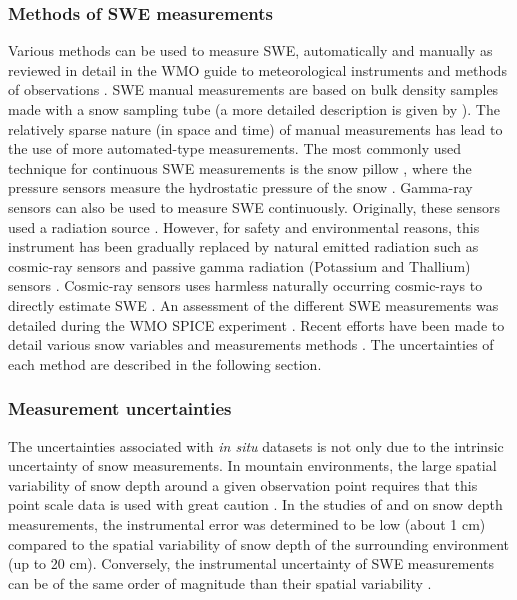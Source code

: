 \documentclass[utf8]{frontiersSCNS} %
\begin{document}
\subsubsection{Methods of SWE measurements}
Various methods can be used to measure SWE, automatically and manually as reviewed in detail in the WMO guide to meteorological instruments and methods of observations \citep{wmo2018}. SWE manual measurements are based on bulk density samples made with a snow sampling tube (a more detailed description is given by \citet{Leppanen_2016}). The relatively sparse nature (in space and time) of manual measurements has lead to the use of more automated-type measurements. The most commonly used technique for continuous SWE measurements is the snow pillow \citep{Serreze_1999,Smith_2017}, where the pressure sensors measure the hydrostatic pressure of the snow \citep{Beaumont_1965}. Gamma-ray sensors can also be used to measure SWE continuously. Originally, these sensors used a radiation source \citep{Harding_1986}. However, for safety and environmental reasons, this instrument has been gradually replaced by natural emitted radiation such as cosmic-ray sensors and passive gamma radiation (Potassium and Thallium) sensors \citep{Choquette_2008,Martin_2008}. Cosmic-ray sensors uses harmless naturally occurring cosmic-rays to directly estimate SWE \citep{Kodama_1979}. An assessment of the different SWE measurements was detailed during the WMO SPICE experiment \citep{Smith_2017}. Recent efforts have been made to detail various snow variables and measurements methods \citep{Pirazzini_2018,Haberkorn_2019}. The uncertainties of each method are described in the following section.


\subsubsection{Measurement uncertainties}

The uncertainties associated with \textit{in situ} datasets is not only due to the intrinsic uncertainty of snow measurements. In mountain environments, the large spatial variability of snow depth around a given observation point requires that this point scale data is used with great caution \citep{Grunewald_2013}. In the studies of \citet{Lafaysse_2017} and \citet{Lejeune_2018} on snow depth measurements, the instrumental error was determined to be low (about 1 cm) compared to the spatial variability of snow depth of the surrounding environment (up to 20 cm). Conversely, the instrumental uncertainty of SWE measurements can be of the same order of magnitude than their spatial variability \citep{Smith_2017,Lafaysse_2017,Lejeune_2018, Nitu_2018}. 
\end{document}
